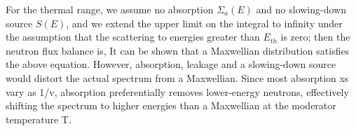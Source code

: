 \documentclass{school-22.211-notes}
\begin{document}
\begin{enumerate}
\begin{itemize}
    For the thermal range, we assume no absorption $\Sigma_a(E)$ and no slowing-down source $S(E)$, and we extend the upper limit on the integral to infinity under the assumption that the scattering to energies greater than $E_{th}$ is zero; then the neutron flux balance is,
   It can be shown that a Maxwellian distribution satisfies the above equation. However, absorption, leakage and a slowing-down source would distort the actual spectrum from a Maxwellian. Since most absorption xs vary as 1/v, absorption preferentially removes lower-energy neutrons, effectively shifting the spectrum to higher energies than a Maxwellian at the moderator temperature T. 
  \end{itemize}
\end{enumerate}
\end{document}

